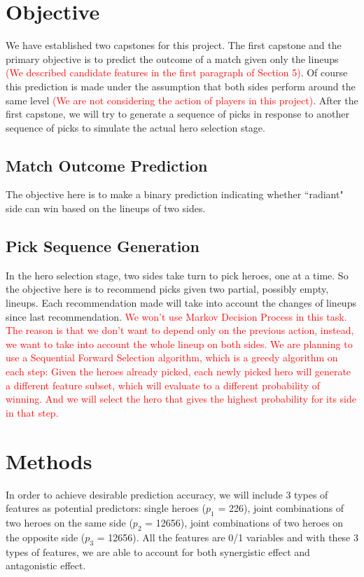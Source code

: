 \documentclass[11pt]{article}
\begin{document}
\section{Objective}
We have established two capstones for this project. The first capstone and the primary objective is to predict the outcome of a match given only the lineups \textcolor{red}{(We described candidate features in the first paragraph of Section 5)}. Of course this prediction is made under the assumption that both sides perform around the same level \textcolor{red}{(We are not considering the action of players in this project)}. After the first capstone, we will try to generate a sequence of picks in response to another sequence of picks to simulate the actual hero selection stage.

\subsection{Match Outcome Prediction}
The objective here is to make a binary prediction indicating whether ``radiant" side can win based on the lineups of two sides.

\subsection{Pick Sequence Generation}
In the hero selection stage, two sides take turn to pick heroes, one at a time. So the objective here is to recommend picks given two partial, possibly empty, lineups. Each recommendation made will take into account the changes of lineups since last recommendation.
\textcolor{red}{We won't use Markov Decision Process in this task. The reason is that we don't want to depend only on the previous action, instead, we want to take into account the whole lineup on both sides. We are planning to use a Sequential Forward Selection algorithm, which is a greedy algorithm on each step: Given the heroes already picked, each newly picked hero will generate a different feature subset, which will evaluate to a different probability of winning. And we will select the hero that gives the highest probability for its side in that step.}

\section{Methods}
In order to achieve desirable prediction accuracy, we will include 3 types of features as potential predictors: single heroes ($p_1$ = 226), joint combinations of two heroes on the same side ($p_2$ = 12656), joint combinations of two heroes on the opposite side ($p_3$ = 12656). All the features are 0/1 variables and with these 3 types of features, we are able to account for both synergistic effect and antagonistic effect.\\ 
\end{document}
